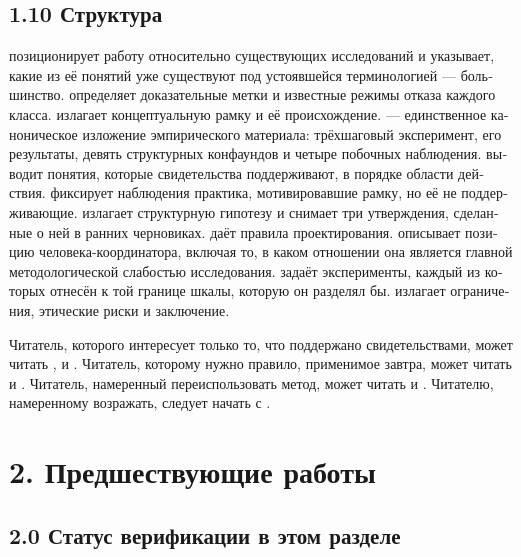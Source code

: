 \begin{russian}
\subsection*{1.10 Структура}
\label{sec:ru:1.10}

\textbf{} позиционирует работу относительно существующих исследований и указывает, какие из её понятий уже существуют под устоявшейся терминологией — большинство. \textbf{} определяет доказательные метки и известные режимы отказа каждого класса. \textbf{} излагает концептуальную рамку и её происхождение. \textbf{} — единственное каноническое изложение эмпирического материала: трёхшаговый эксперимент, его результаты, девять структурных конфаундов и четыре побочных наблюдения. \textbf{} выводит понятия, которые свидетельства поддерживают, в порядке области действия. \textbf{} фиксирует наблюдения практика, мотивировавшие рамку, но её не поддерживающие. \textbf{} излагает структурную гипотезу и снимает три утверждения, сделанные о ней в ранних черновиках. \textbf{} даёт правила проектирования. \textbf{} описывает позицию человека-координатора, включая то, в каком отношении она является главной методологической слабостью исследования. \textbf{} задаёт эксперименты, каждый из которых отнесён к той границе шкалы, которую он разделял бы. \textbf{} излагает ограничения, этические риски и заключение.

Читатель, которого интересует только то, что поддержано свидетельствами, может читать ,  и . Читатель, которому нужно правило, применимое завтра, может читать  и . Читатель, намеренный переиспользовать метод, может читать  и . Читателю, намеренному возражать, следует начать с .


\section*{2. Предшествующие работы}
\label{sec:ru:2}


\subsection*{2.0 Статус верификации в этом разделе}
\label{sec:ru:2.0}


\end{russian}
